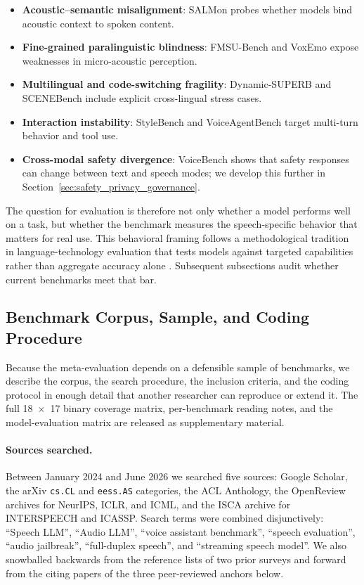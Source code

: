 \begin{itemize}
  \item \textbf{Acoustic--semantic misalignment}: SALMon \citep{maimon2024salmon} probes whether models bind acoustic context to spoken content.
  \item \textbf{Fine-grained paralinguistic blindness}: FMSU-Bench \citep{li2026fmsubench} and VoxEmo \citep{zhang2026voxemo} expose weaknesses in micro-acoustic perception.
  \item \textbf{Multilingual and code-switching fragility}: Dynamic-SUPERB \citep{huang2024dynamicsuperb} and SCENEBench \citep{iyer2026scenebench} include explicit cross-lingual stress cases.
  \item \textbf{Interaction instability}: StyleBench \citep{zhao2026stylebench} and VoiceAgentBench \citep{jain2025voiceagentbench} target multi-turn behavior and tool use.
  \item \textbf{Cross-modal safety divergence}: VoiceBench \citep{chen2024voicebench} shows that safety responses can change between text and speech modes; we develop this further in Section~\ref{sec:safety_privacy_governance}.
\end{itemize}

The question for evaluation is therefore not only whether a model performs
well on a task, but whether the benchmark measures the speech-specific
behavior that matters for real use. This behavioral framing follows a
methodological tradition in language-technology evaluation that tests
models against targeted capabilities rather than aggregate accuracy alone
\citep{ribeiro2020checklist}. Subsequent subsections audit whether
current benchmarks meet that bar.

\subsection{Benchmark Corpus, Sample, and Coding Procedure}
\label{subsec:eval_corpus}

Because the meta-evaluation depends on a defensible sample of
benchmarks, we describe the corpus, the search procedure, the
inclusion criteria, and the coding protocol in enough detail that
another researcher can reproduce or extend it. The full 18~$\times$~17
binary coverage matrix, per-benchmark reading notes, and the
model-evaluation matrix are released as supplementary material.

\paragraph{Sources searched.}
Between January 2024 and June 2026 we searched five sources: Google
Scholar, the arXiv \texttt{cs.CL} and \texttt{eess.AS} categories, the
ACL Anthology, the OpenReview archives for NeurIPS, ICLR, and ICML,
and the ISCA archive for INTERSPEECH and ICASSP. Search terms were
combined disjunctively: ``Speech LLM'', ``Audio LLM'', ``voice
assistant benchmark'', ``speech evaluation'', ``audio jailbreak'',
``full-duplex speech'', and ``streaming speech model''. We also
snowballed backwards from the reference lists of two prior surveys
\citep{cui2024recent,peng2025surveyspeechlargelanguage} and forward
from the citing papers of the three peer-reviewed anchors below.

